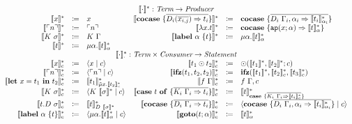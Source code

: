 \[
  \begin{array}{rcl rcl}
    \multicolumn{6}{c}{\translatestar{\cdot}{} : \emph{Term} \rightarrow  \emph{Producer}}\\
    \translatestar{x}{} & \coloneqq & x & 
    \translatestar{\cocase{\overline{D_i(\overline{x_{i,j}}) \Rightarrow t_i}}}{} & \coloneq & \cocase{\overline{D_i\ \Gamma_i,\alpha_i \Rightarrow \translatestar{t_i}{\alpha_i}}} \\
    \translatestar{\lit{n}}{} & \coloneqq & \lit{n}  &
    \translatestar{\lambda x.t}{} & \coloneq & \cocase{\mathtt{ap}(x; \alpha) \Rightarrow \translatestar{t}{\alpha}} \\
    \translatestar{K\ \sigma}{} & \coloneqq & K\ \Gamma{} &
    \translatestar{\lab{\alpha}{t}}{} & \coloneq & \mu \alpha.\translatestar{t}{\alpha}{} \\
    \translatestar{t}{} & \coloneqq & \mu\alpha.\translatestar{t}{\alpha} &  &
    \\
    \multicolumn{6}{c}{\translatestar{\cdot}{\cdot} : \emph{Term} \times \emph{Consumer} \rightarrow \emph{Statement}}\\
    \translatestar{x}{c} & \coloneq & \cut{x}{c} & 
    \translatestar{t_1 \odot t_2}{c} & \coloneq & \odot(\translatestar{t_1}{}, \translatestar{t_2}{}; c)  \\
    \translatestar{\lit{n}}{c} & \coloneq & \cut{\lit{n}}{c} & 
    \translatestar{\ifz{t_1}{t_2}{t_2}}{c} & \coloneq & \ifz{\translatestar{t_1}{}}{\translatestar{t_2}{c}}{\translatestar{t_3}{c}}  \\
    \translatestar{\letin{x}{t_1}{t_2}}{c} & \coloneq & \translatestar{t_1}{\tilde{\mu}x.\translatestar{t_2}{c}} & 
    \translatestar{f\ \Gamma}{c} & \coloneq & f\ \Gamma,c \\
    \translatestar{K\ \sigma}{c} & \coloneq & \cut{K\ \translatestar{\sigma}{}}{c} & 
    \translatestar{\caseof{t}{\overline{K_i\ \Gamma_i \Rightarrow t_i}}}{c} & \coloneq & \translatestar{t}{\case{\overline{K_i\ \Gamma_i \Rightarrow \translatestar{t_i}{c}}}} \\
    \translatestar{t.D\ \sigma}{c} & \coloneq & \translatestar{t}{D\ \translatestar{\sigma}{}} &
    \translatestar{\cocase{\overline{D_i\ \Gamma_i \Rightarrow t_i}}}{c} & \coloneq & \cut{\cocase{\overline{D_i\ \Gamma_i,\alpha_i \Rightarrow \translatestar{t_i}{\alpha_i}}}}{c}  \\
    \translatestar{\lab{\alpha}{t}}{c} & \coloneq & \cut{\mu \alpha.\translatestar{t}{\alpha}}{c} & 
    \translatestar{\goto{t}{\alpha}}{c} & \coloneq & \translatestar{t}{\alpha} \\

\end{array}\]
